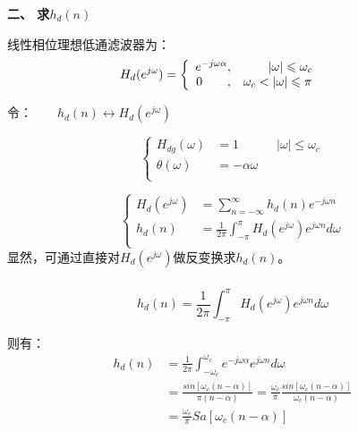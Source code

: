 \documentclass[notheorems,compress,mathserif,table]{beamer}
\begin{document}
\begin{frame}[shrink]\frametitle{}%
     \textbf{二、 求$h_d(n)$}\par
     线性相位理想低通滤波器为：
      $$
        H_d(e^{j\omega}) =
        \left\{\begin{array}
             {r@{,\quad}l}
             e^{-j\omega\alpha} & \quad\quad|\omega|\leqslant \omega_c\quad\quad\\
             0 \quad\quad       & \omega_c<|\omega|\leqslant \pi
        \end{array} \right.
      $$

      \begin{center}
      令：$\quad\quad h_d(n)\longleftrightarrow H_d(e^{j\omega})\quad\quad\quad\quad\quad\quad$
      \end{center}


      $$
        \left\{ \begin{aligned}
          H_{dg}(\omega) &=1\quad\quad\quad |\omega|\leqslant \omega_c\\
          \theta(\omega)\quad &=-\alpha\omega\\
        \end{aligned} \right.
      $$

      $$
        \left\{ \begin{aligned}
          H_d(e^{j\omega})
             &=\sum_{n=-\infty}^{\infty}h_d(n)e^{-j\omega n}\\
          h_d(n)
             &=\frac{1}{2\pi}\int_{-\pi}^{\pi}H_d(e^{j\omega})e^{j\omega n}d\omega\\
        \end{aligned} \right.
      $$
      显然，可通过直接对$H_d(e^{j\omega})$做反变换求$h_d(n)$。

\end{frame}


\begin{frame}[shrink]\frametitle{}%
$$h_d(n)=\frac{1}{2\pi}\int_{-\pi}^{\pi}H_d(e^{j\omega})e^{j\omega n}d\omega$$

      则有：
      \begin{equation*}
        \begin{split}
        h_d(n)
          &=\frac{1}{2\pi}\int_{-\omega_c}^{\omega_c}
             e^{-j\omega\alpha}e^{j\omega n}d\omega\\
          &=\frac{sin\left[\omega_c(n-\alpha)\right]}{\pi(n-\alpha)}
           =\frac{\omega_c}{\pi}\frac{sin\left[\omega_c(n-\alpha)\right]}
            {\omega_c(n-\alpha)}\\
          &=\frac{\omega_c}{\pi}Sa\left[\omega_c(n-\alpha)\right]
        \end{split}
      \end{equation*}
\end{frame}
\end{document}
